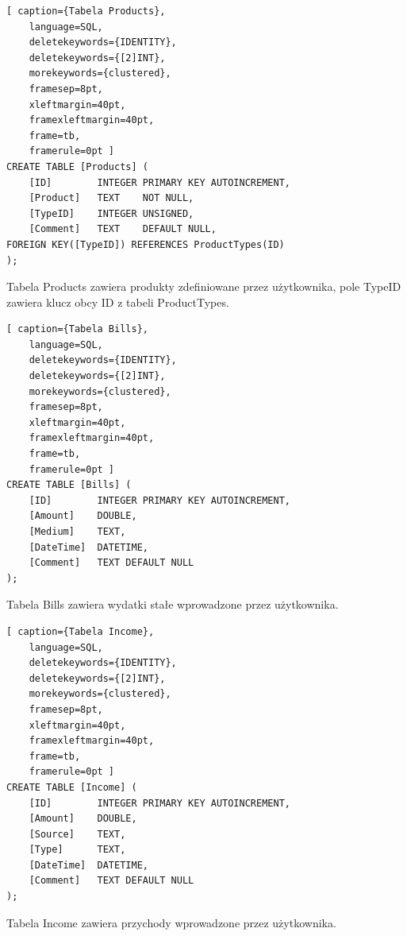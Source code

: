 \documentclass[a4paper,10pt, twoside]{report}
\begin{document}

\begin{minipage}{\textwidth}
\begin{lstlisting}[ caption={Tabela Products},
    language=SQL,
    deletekeywords={IDENTITY},
    deletekeywords={[2]INT},
    morekeywords={clustered},
    framesep=8pt,
    xleftmargin=40pt,
    framexleftmargin=40pt,
    frame=tb,
    framerule=0pt ]
CREATE TABLE [Products] (
    [ID]        INTEGER PRIMARY KEY AUTOINCREMENT,
    [Product]   TEXT    NOT NULL,
    [TypeID]	INTEGER UNSIGNED, 
    [Comment] 	TEXT    DEFAULT NULL,
FOREIGN KEY([TypeID]) REFERENCES ProductTypes(ID)
);
\end{lstlisting}
{Tabela Products zawiera produkty zdefiniowane przez użytkownika, pole TypeID 
zawiera klucz obcy ID z tabeli ProductTypes.}
\end{minipage}

\begin{minipage}{\textwidth}
\begin{lstlisting}[ caption={Tabela Bills},
    language=SQL,
    deletekeywords={IDENTITY},
    deletekeywords={[2]INT},
    morekeywords={clustered},
    framesep=8pt,
    xleftmargin=40pt,
    framexleftmargin=40pt,
    frame=tb,
    framerule=0pt ]
CREATE TABLE [Bills] (
    [ID]        INTEGER PRIMARY KEY AUTOINCREMENT,
    [Amount]    DOUBLE,
    [Medium]    TEXT,
    [DateTime]  DATETIME,
    [Comment]   TEXT DEFAULT NULL
);
\end{lstlisting}
{Tabela Bills zawiera wydatki stałe wprowadzone przez użytkownika.}
\end{minipage}

\begin{minipage}{\textwidth}
\begin{lstlisting}[ caption={Tabela Income},
    language=SQL,
    deletekeywords={IDENTITY},
    deletekeywords={[2]INT},
    morekeywords={clustered},
    framesep=8pt,
    xleftmargin=40pt,
    framexleftmargin=40pt,
    frame=tb,
    framerule=0pt ]
CREATE TABLE [Income] (
	[ID] 		INTEGER PRIMARY KEY AUTOINCREMENT,
	[Amount]	DOUBLE,
	[Source]	TEXT,
	[Type]		TEXT,
	[DateTime]	DATETIME,
	[Comment]	TEXT DEFAULT NULL
);
\end{lstlisting}
{Tabela Income zawiera przychody wprowadzone przez użytkownika.}
\end{minipage}
\end{document}
